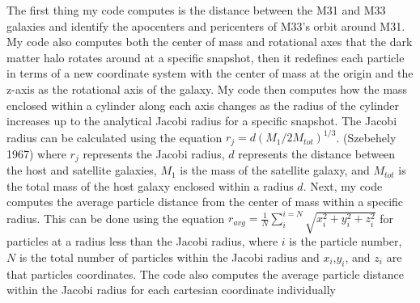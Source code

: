 \documentclass[fleqn,usenatbib]{mnras}
\begin{document}
        The first thing my code computes is the distance between the M31 and M33 galaxies and identify the apocenters and pericenters of M33's orbit around M31. My code also computes both the center of mass and rotational axes that the dark matter halo rotates around at a specific snapshot, then it redefines each particle in terms of a new coordinate system with the center of mass at the origin and the z-axis as the rotational axis of the galaxy. My code then computes how the mass enclosed within a cylinder along each axis changes as the radius of the cylinder increases up to the analytical Jacobi radius for a specific snapshot. The Jacobi radius can be calculated using the equation $r_j = d(M_1/{2M_{tot}})^{1/3}$. (Szebehely 1967) where $r_j$ represents the Jacobi radius, $d$ represents the distance between the host and satellite galaxies, $M_1$ is the mass of the satellite galaxy, and $M_{tot}$ is the total mass of the host galaxy enclosed within a radius $d$. Next, my code computes the average particle distance from the center of mass within a specific radius. This can be done using the equation $r_{avg} = \frac{1}{N}\sum_i^{i=N} \sqrt{x_i^2+y_i^2+z_i^2}$ for particles at a radius less than the Jacobi radius, where $i$ is the particle number, $N$ is the total number of particles within the Jacobi radius and $x_i$,$y_i$, and $z_i$ are that particles coordinates. The code also computes the average particle distance within the Jacobi radius for each cartesian coordinate individually
\end{document}
